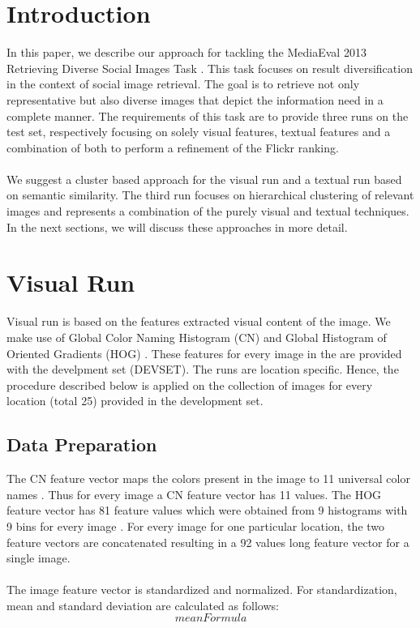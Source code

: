 \documentclass{acm_proc_article-me11_tweaked}
\begin{document}
\section{Introduction}
In this paper, we describe our approach for tackling the MediaEval 2013 Retrieving Diverse Social Images Task \cite{mediaeval-diversephotos}.
This task focuses on result diversification in the context of social image retrieval. 
The goal is to retrieve not only representative but also diverse images that depict the information need in a complete manner.
The requirements of this task are to provide three runs on the test set, respectively focusing on solely visual features, textual features and a combination of both to perform a refinement of the Flickr ranking.
\\\\
We suggest a cluster based approach for the visual run and a textual run based on semantic similarity.
The third run focuses on hierarchical clustering of relevant images and represents a combination of the purely visual and textual techniques.
In the next sections, we will discuss these approaches in more detail.

\section{Visual Run}
\label{visual-similarity}

Visual run is based on the features extracted visual content of the image. We make use of Global Color Naming Histogram (CN) \cite{cn-paper} and Global Histogram of Oriented Gradients (HOG) \cite{hog-paper}. 
These features for every image in the are provided with the develpment set (DEVSET). The runs are location specific. 
Hence, the procedure described below is applied on the collection of images for every location (total 25) provided in the development set.
\subsection{Data Preparation}
The CN feature vector maps the colors present in the image to 11 universal color names \cite{wn-overview-paper} . 
Thus for every image a CN feature vector has 11 values. The HOG feature vector has 81 feature values which were obtained from 9 histograms with 9 bins for every image \cite{wn-overview-paper}.
For every image for one particular location, the two feature vectors are concatenated resulting in a 92 values long feature vector for a single image.
\\\\
The image feature vector is standardized and normalized. For standardization, mean and standard deviation are calculated as follows:
\begin{equation}
 meanFormula
\end{equation}
\end{document}
